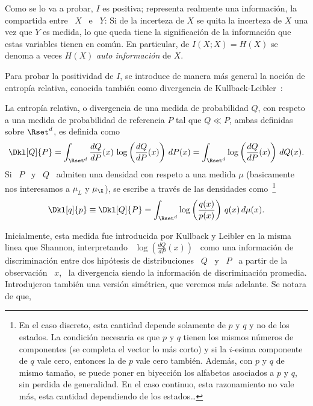 Como se lo va a probar, $I$ es positiva; representa realmente una informaci\'on,
la compartida  entre \ $X$  \ e  \ $Y$: Si  de la incerteza  de $X$ se  quita la
incerteza  de  $X$   una  vez  que  $Y$  es  medida,  lo   que  queda  tiene  la
significaci\'on de  la informaci\'on que  estas variables tienen en  com\'un. En
particular, de $I(X;X) = H(X)$ se denoma a veces $H(X)$ {\it auto informaci\'on}
de $X$.

Para  probar la  positividad de  $I$, se  introduce de  manera m\'as  general la
noci\'on  de  entrop\'ia  relativa,   conocida  tambi\'en  como  divergencia  de
Kullback-Leibler~\cite{KulLei51, Kul68, CovTho06, Rio07}:
%
\begin{definicion}
\label{Def:SZ:entropiarelativa}
%
La entrop\'ia  relativa, o  divergencia de una  medida de probabilidad  $Q$, con
respeto a una medida de probabilidad de referencia $P$ tal que \underline{$Q \ll
  P$}, ambas definidas sobre $\Rset^d$, es definida como
  \[
  \Dkl[Q]{P}  =  \int_{\Rset^d}  \frac{dQ}{dP}(x) \, \log  \left(  \frac{dQ}{dP}(x)
  \right)  \, dP(x)  = \int_{\Rset^d}  \log \left(  \frac{dQ}{dP}(x)  \right) \,
  dQ(x).
  \]
  Si \  $P$ \  y \ $Q$  \ admiten una  densidad con  respeto a una  medida $\mu$
  (basicamente nos interesamos  a $\mu_L$ y $\mu_\X$), se  escribe a trav\'es de
  las  densidades  como~\footnote{En el  caso  discreto,  esta cantidad  depende
    solamente de $p$ y $q$ y no  de los estados. La condici\'on necesaria es que
    $p$ y $q$ tienen los mismos  n\'umeros de componentes (se completa el vector
    lo m\'as corto)  y si la $i$-esima componente de $q$  vale cero, entonces la
    de $p$ vale  cero tambi\'en.  Adem\'as, con $p$ y $q$  de mismo tama\~no, se
    puede poner en biyecci\'on los alfabetos  asociados a $p$ y $q$, sin perdida
    de generalidad.  En el caso  continuo, esta razonamiento no vale m\'as, esta
    cantidad dependiendo de los estados\ldots}
 \[
 \Dkl[q]{p}  \equiv \Dkl[Q]{P}  = \int_{\Rset^d}  \log  \left( \frac{q(x)}{p(x)}
 \right) \, q(x) \, d\mu(x).
 \]
\end{definicion}
%
Inicialmente, esta  medida fue  introducida por Kullback  y Leibler en  la misma
linea  que Shannon, interpretando  \ $\log\left(\frac{dQ}{dP}(x)\right)$  \ como
una informaci\'on de discriminaci\'on  entre dos hip\'otesis de distribuciones \
$Q$ \ y \  $P$ \ a partir de la observaci\'on \ $x$,  \ la divergencia siendo la
informaci\'on   de  discriminaci\'on   promedia.   Introdujeron   tambi\'en  una
versi\'on  sim\'etrica,   que  veremos  m\'as  adelante.   Se   notara  de  que,
